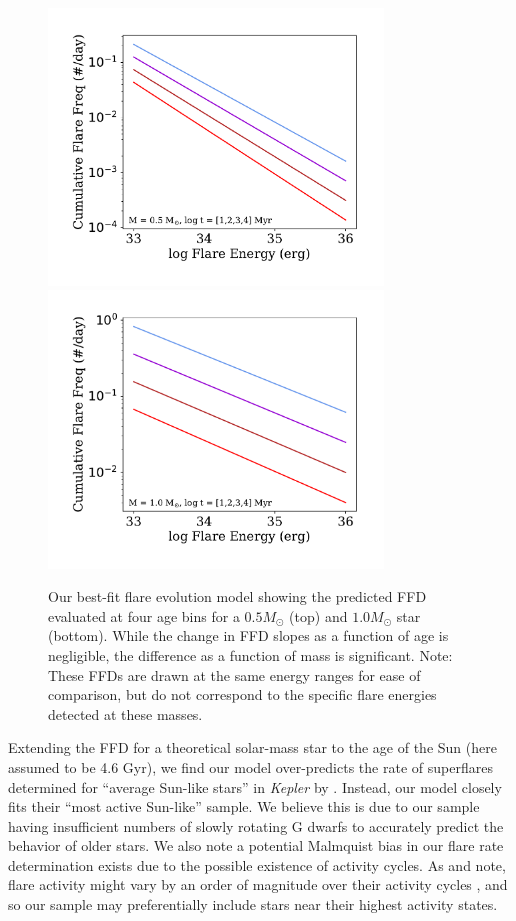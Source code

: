\documentclass[preprint2]{aastex62}
\newcommand{\Kepler}{\textsl{Kepler}\xspace}
\begin{document}
\begin{figure}[!t]
\centering
\includegraphics[width=3.5in]{fig10a}
\includegraphics[width=3.5in]{fig10b}
\caption{
Our best-fit flare evolution model showing the predicted FFD evaluated at four age bins for a $0.5 M_\odot$ (top) and $1.0 M_\odot$ star (bottom). While the change in FFD slopes as a function of age is negligible, the difference as a function of mass is significant. Note: These FFDs are drawn at the same energy ranges for ease of comparison, but do not correspond to the specific flare energies detected at these masses.
}
\label{fig:model}
\end{figure}




Extending the FFD for a theoretical solar-mass star to the age of the Sun (here assumed to be 4.6 Gyr), we find our model over-predicts the rate of superflares determined for ``average Sun-like stars'' in \Kepler by \citet{shibayama2013}. Instead, our model closely fits their ``most active Sun-like'' sample. We believe this is due to our sample having insufficient numbers of slowly rotating G dwarfs to accurately predict the behavior of older stars. We also note a potential Malmquist bias in our flare rate determination exists due to the possible existence of activity cycles. As \citet{shibayama2013} and \citet{clarke2018} note, flare activity might vary by an order of magnitude over their activity cycles \citep[see also][]{veronig2002}, and so our sample may preferentially include stars near their highest activity states.
\end{document}
